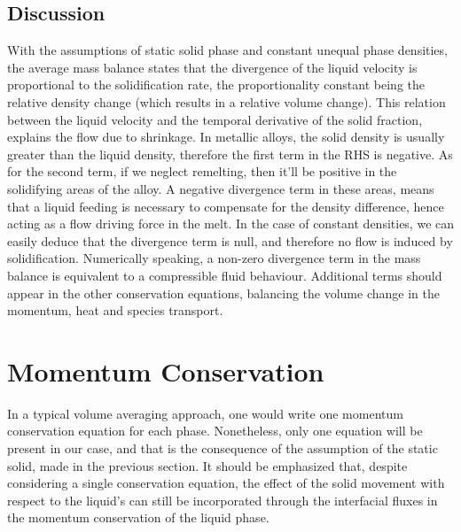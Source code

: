 \subsection{Discussion}
With the assumptions of static solid phase and constant unequal phase densities, the average mass balance states that 
the divergence of the liquid velocity is proportional to the solidification rate, the proportionality constant being the
relative density change (which results in a relative volume change). This relation between the liquid velocity and the
temporal derivative of the solid fraction, explains the flow due to shrinkage. In metallic alloys, the solid density is
usually greater than the liquid density, therefore the first term in the RHS is negative. As for the second term, if we
neglect remelting, then it'll be positive in the solidifying areas of the alloy. A negative divergence term in these areas, 
means that a liquid feeding is necessary to compensate for the density difference, hence acting as a flow driving force in the melt.
In the case of constant densities, we can easily deduce that the divergence term is null, and therefore no flow is induced
by solidification.
\newline
Numerically speaking, a non-zero divergence term in the mass balance is equivalent to a compressible fluid behaviour. Additional 
terms should appear in the other conservation equations, balancing the volume change in the momentum, heat and species transport.

\section{Momentum Conservation}
In a typical volume averaging approach, one would write one momentum conservation 
equation for each phase. Nonetheless, only one equation will be present in our case, 
and that is the consequence of the assumption of the static solid, made in the previous 
section. It should be emphasized that, despite considering a single conservation equation, 
the effect of the solid movement with respect to the liquid's can still be incorporated 
through the interfacial fluxes in the momentum conservation of the liquid phase. 
